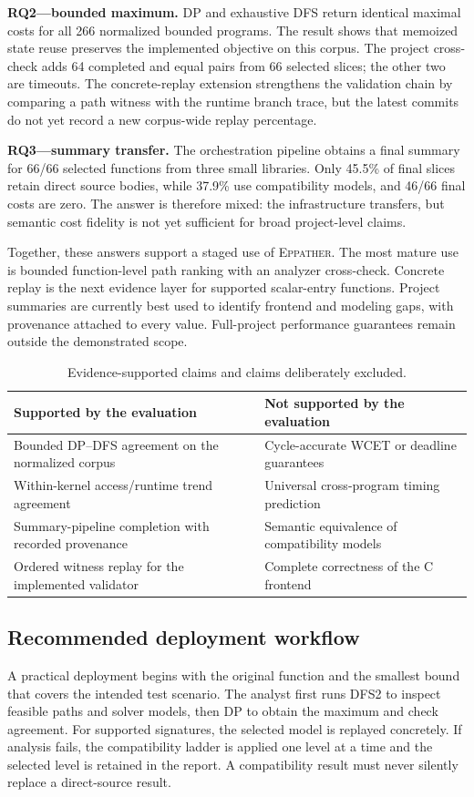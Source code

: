 \documentclass[10pt,conference]{IEEEtran}
\newcommand{\tool}{\textsc{Eppather}\xspace}
\begin{document}
\textbf{RQ2---bounded maximum.} DP and exhaustive DFS return identical maximal costs for all 266 normalized bounded programs. The result shows that memoized state reuse preserves the implemented objective on this corpus. The project cross-check adds 64 completed and equal pairs from 66 selected slices; the other two are timeouts. The concrete-replay extension strengthens the validation chain by comparing a path witness with the runtime branch trace, but the latest commits do not yet record a new corpus-wide replay percentage.

\textbf{RQ3---summary transfer.} The orchestration pipeline obtains a final summary for 66/66 selected functions from three small libraries. Only 45.5\% of final slices retain direct source bodies, while 37.9\% use compatibility models, and 46/66 final costs are zero. The answer is therefore mixed: the infrastructure transfers, but semantic cost fidelity is not yet sufficient for broad project-level claims.

Together, these answers support a staged use of \tool. The most mature use is bounded function-level path ranking with an analyzer cross-check. Concrete replay is the next evidence layer for supported scalar-entry functions. Project summaries are currently best used to identify frontend and modeling gaps, with provenance attached to every value. Full-project performance guarantees remain outside the demonstrated scope.

\begin{table}[t]
\centering
\caption{Evidence-supported claims and claims deliberately excluded.}
\label{tab:claims}
\begin{tabular}{p{}p{}}
\toprule
Supported by the evaluation & Not supported by the evaluation\\
\midrule
Bounded DP--DFS agreement on the normalized corpus & Cycle-accurate WCET or deadline guarantees\\
Within-kernel access/runtime trend agreement & Universal cross-program timing prediction\\
Summary-pipeline completion with recorded provenance & Semantic equivalence of compatibility models\\
Ordered witness replay for the implemented validator & Complete correctness of the C frontend\\
\bottomrule
\end{tabular}
\end{table}

\subsection{Recommended deployment workflow}
A practical deployment begins with the original function and the smallest bound that covers the intended test scenario. The analyst first runs DFS2 to inspect feasible paths and solver models, then DP to obtain the maximum and check agreement. For supported signatures, the selected model is replayed concretely. If analysis fails, the compatibility ladder is applied one level at a time and the selected level is retained in the report. A compatibility result must never silently replace a direct-source result.
\end{document}
